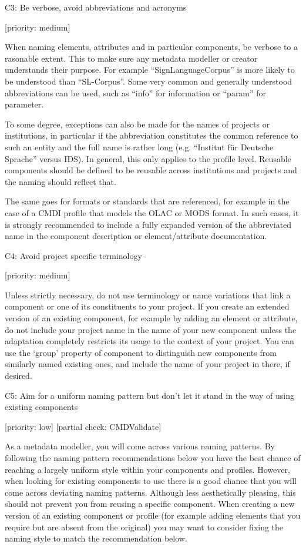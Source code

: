 C3: Be verbose, avoid abbreviations and acronyms

{[}priority: medium{]}

When naming elements, attributes and in particular components, be
verbose to a rasonable extent. This to make sure any metadata modeller
or creator understands their purpose. For example ``SignLanguageCorpus''
is more likely to be understood than ``SL-Corpus''. Some very common and
generally understood abbreviations can be used, such as ``info'' for
information or ``param'' for parameter.

To some degree, exceptions can also be made for the names of projects or
institutions, in particular if the abbreviation constitutes the common
reference to such an entity and the full name is rather long (e.g.
``Institut für Deutsche Sprache'' versus IDS). In general, this only
applies to the profile level. Reusable components should be defined to
be reusable across institutions and projects and the naming should
reflect that.

The same goes for formats or standards that are referenced, for example
in the case of a CMDI profile that models the OLAC or MODS format. In
such cases, it is strongly recommended to include a fully expanded
version of the abbreviated name in the component description or
element/attribute documentation.

C4: Avoid project specific terminology

{[}priority: medium{]}

Unless strictly necessary, do not use terminology or name variations
that link a component or one of its constituents to your project. If you
create an extended version of an existing component, for example by
adding an element or attribute, do not include your project name in the
name of your new component unless the adaptation completely restricts
its usage to the context of your project. You can use the `group'
property of component to distinguish new components from similarly named
existing ones, and include the name of your project in there, if
desired.

C5: Aim for a uniform naming pattern but don't let it stand in the way
of using existing components

{[}priority: low{]} {[}partial check: CMDValidate{]}

As a metadata modeller, you will come across various naming patterns. By
following the naming pattern recommendations below you have the best
chance of reaching a largely uniform style within your components and
profiles. However, when looking for existing components to use there is
a good chance that you will come across deviating naming patterns.
Although less aesthetically pleasing, this should not prevent you from
reusing a specific component. When creating a new version of an existing
component or profile (for example adding elements that you require but
are absent from the original) you may want to consider fixing the naming
style to match the recommendation below.

